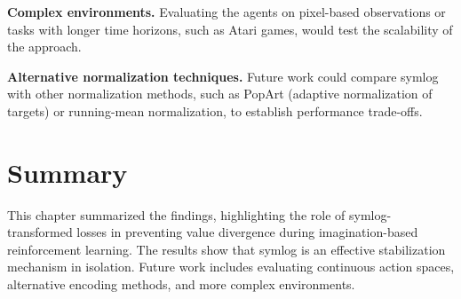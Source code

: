 \textbf{Complex environments.} Evaluating the agents on pixel-based observations or tasks with longer time horizons, such as Atari games, would test the scalability of the approach.

\textbf{Alternative normalization techniques.} Future work could compare symlog with other normalization methods, such as PopArt (adaptive normalization of targets) or running-mean normalization, to establish performance trade-offs.

\section{Summary}

This chapter summarized the findings, highlighting the role of symlog-transformed losses in preventing value divergence during imagination-based reinforcement learning. The results show that symlog is an effective stabilization mechanism in isolation. Future work includes evaluating continuous action spaces, alternative encoding methods, and more complex environments.